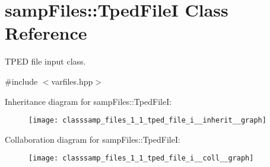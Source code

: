 \hypertarget{classsamp_files_1_1_tped_file_i}{}\section{samp\+Files\+:\+:Tped\+FileI Class Reference}
\label{classsamp_files_1_1_tped_file_i}


T\+P\+ED file input class.  




{\ttfamily \#include $<$varfiles.\+hpp$>$}



Inheritance diagram for samp\+Files\+:\+:Tped\+FileI\+:\nopagebreak
\begin{figure}[H]
\begin{center}
\leavevmode
\texttt{[image: classsamp\_files\_1\_1\_tped\_file\_i\_\_inherit\_\_graph]}
\end{center}
\end{figure}


Collaboration diagram for samp\+Files\+:\+:Tped\+FileI\+:\nopagebreak
\begin{figure}[H]
\begin{center}
\leavevmode
\texttt{[image: classsamp\_files\_1\_1\_tped\_file\_i\_\_coll\_\_graph]}
\end{center}
\end{figure}
